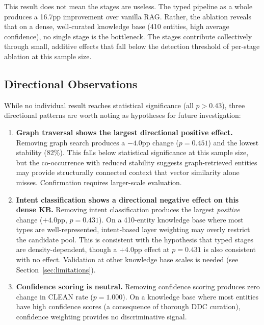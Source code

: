 \documentclass[11pt,a4paper]{article}
\begin{document}
This result does not mean the stages are useless. The typed pipeline as a whole produces a 16.7pp improvement over vanilla RAG. Rather, the ablation reveals that on a dense, well-curated knowledge base (410 entities, high average confidence), no single stage is the bottleneck. The stages contribute collectively through small, additive effects that fall below the detection threshold of per-stage ablation at this sample size.

\subsection{Directional Observations}

While no individual result reaches statistical significance (all $p > 0.43$), three directional patterns are worth noting as hypotheses for future investigation:

\begin{enumerate}[nosep]
  \item \textbf{Graph traversal shows the largest directional positive effect.} Removing graph search produces a $-4.0$pp change ($p = 0.451$) and the lowest stability (82\%). This falls below statistical significance at this sample size, but the co-occurrence with reduced stability suggests graph-retrieved entities may provide structurally connected context that vector similarity alone misses. Confirmation requires larger-scale evaluation.
  \item \textbf{Intent classification shows a directional negative effect on this dense KB.} Removing intent classification produces the largest \emph{positive} change ($+4.0$pp, $p = 0.431$). On a 410-entity knowledge base where most types are well-represented, intent-based layer weighting may overly restrict the candidate pool. This is consistent with the hypothesis that typed stages are density-dependent, though a $+4.0$pp effect at $p = 0.431$ is also consistent with no effect. Validation at other knowledge base scales is needed (see Section~\ref{sec:limitations}).
  \item \textbf{Confidence scoring is neutral.} Removing confidence scoring produces zero change in CLEAN rate ($p = 1.000$). On a knowledge base where most entities have high confidence scores (a consequence of thorough DDC curation), confidence weighting provides no discriminative signal.
\end{enumerate}

\end{document}
